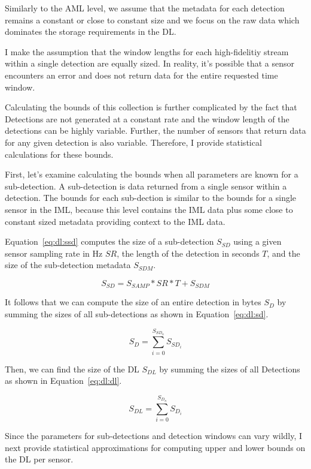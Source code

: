 Similarly to the AML level, we assume that the metadata for each detection remains a constant or close to constant size and we focus on the raw data which dominates the storage requirements in the DL.

I make the assumption that the window lengths for each high-fidelitiy stream within a single detection are equally sized. In reality, it's possible that a sensor encounters an error and does not return data for the entire requested time window.

Calculating the bounds of this collection is further complicated by the fact that Detections are not generated at a constant rate and the window length of the detections can be highly variable. Further, the number of sensors that return data for any given detection is also variable. Therefore, I provide statistical calculations for these bounds.

First, let's examine calculating the bounds when all parameters are known for a sub-detection. A sub-detection is data returned from a single sensor within a detection. The bounds for each sub-dection is similar to the bounds for a single sensor in the IML, because this level contains the IML data plus some close to constant sized metadata providing context to the IML data.

Equation~\ref{eq:dl:ssd} computes the size of a sub-detection $S_{SD}$ using a given sensor sampling rate in Hz $SR$, the length of the detection in seconds $T$, and the size of the sub-detection metadata $S_{SDM}$.

\begin{equation}\label{eq:dl:ssd}
	S_{SD} = S_{SAMP} * SR * T + S_{SDM}
\end{equation}

It follows that we can compute the size of an entire detection in bytes $S_{D}$ by summing the sizes of all sub-detections as shown in Equation~\ref{eq:dl:sd}.

\begin{equation}\label{eq:dl:sd}
	S_{D} = \sum_{i=0}^{S_{SD_{n}}} S_{SD_{i}}
\end{equation}

Then, we can find the size of the DL $S_{DL}$ by summing the sizes of all Detections as shown in Equation~\ref{eq:dl:dl}.

\begin{equation}\label{eq:dl:dl}
	S_{DL} = \sum_{i=0}^{S_{D_{n}}} S_{D_{i}}
\end{equation}

Since the parameters for sub-detections and detection windows can vary wildly, I next provide statistical approximations for computing upper and lower bounds on the DL per sensor.

